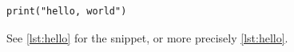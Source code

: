 \begin{listing}[htbp]
\begin{verbatim}
print("hello, world")
\end{verbatim}
\caption{A greeting in Python}
\label{lst:hello}
\end{listing}

See \ref{lst:hello} for the snippet, or more precisely \cref{lst:hello}.

